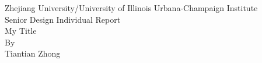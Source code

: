 \documentclass[a4paper, 11pt]{article}
\def\AUTHORNAME{Tiantian Zhong}
\def\RPTTITLE{My Title}
\begin{document}
\begin{titlepage}
    \large
    \vspace{1.5cm}
    \begin{center}
        \Large Zhejiang University/University of Illinois Urbana-Champaign Institute \\
        \vspace{1.5cm}
        \Huge\fontsize Senior Design Individual Report \\
        \vspace{1.5cm}
        \Huge \RPTTITLE \\
        \vspace{0.5cm}
        {\large By} \\
        \vspace{1cm}
        \AUTHORNAME
    \end{center}
\end{titlepage}
\end{document}

